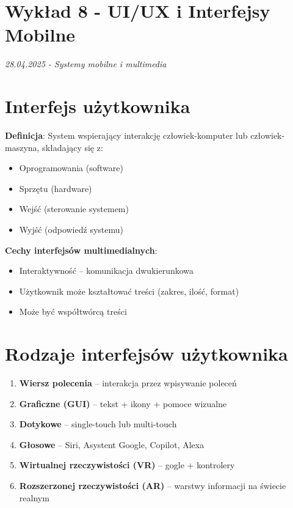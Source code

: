 \section*{Wykład 8 - UI/UX i Interfejsy Mobilne}
\textit{28.04.2025 - Systemy mobilne i multimedia}

\section{Interfejs użytkownika}

\textbf{Definicja}: System wspierający interakcję człowiek-komputer lub człowiek-maszyna, składający się z:
\begin{itemize}
    \item Oprogramowania (software)
    \item Sprzętu (hardware) 
    \item Wejść (sterowanie systemem)
    \item Wyjść (odpowiedź systemu)
\end{itemize}

\textbf{Cechy interfejsów multimedialnych}:
\begin{itemize}
    \item Interaktywność -- komunikacja dwukierunkowa
    \item Użytkownik może kształtować treści (zakres, ilość, format)
    \item Może być współtwórcą treści
\end{itemize}

\section{Rodzaje interfejsów użytkownika}

\begin{enumerate}
    \item \textbf{Wiersz polecenia} -- interakcja przez wpisywanie poleceń
    \item \textbf{Graficzne (GUI)} -- tekst + ikony + pomoce wizualne
    \item \textbf{Dotykowe} -- single-touch lub multi-touch
    \item \textbf{Głosowe} -- Siri, Asystent Google, Copilot, Alexa
    \item \textbf{Wirtualnej rzeczywistości (VR)} -- gogle + kontrolery
    \item \textbf{Rozszerzonej rzeczywistości (AR)} -- warstwy informacji na świecie realnym
\end{enumerate}

